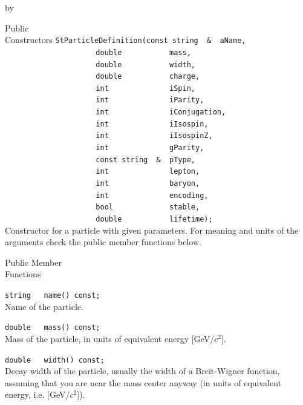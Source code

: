 \documentclass[twoside]{article}
\newcommand{\entrylabel}[1]{\mbox{\textbf{{#1}}}\hfil}%
\newenvironment{entry}
{\begin{list}{}%
    {\renewcommand{\makelabel}{\entrylabel}%
     \setlength{\labelwidth}{90pt}%
     \setlength{\leftmargin}{\labelwidth}
     \advance\leftmargin by \labelsep%
      }%
    }%
  {\end{list}}
\newcommand{\Entrylabel}[1]%
{\raisebox{0pt}[1ex][0pt]{\makebox[\labelwidth][l]%
    {\parbox[t]{\labelwidth}{\hspace{0pt}\textbf{{#1}}}}}}
\newenvironment{Entry}%
{\renewcommand{\entrylabel}{\Entrylabel}\begin{entry}}%
  {\end{entry}}
\begin{document}
\begin{description}
\begin{Entry}
\item[Public\\ Constructors]
    \verb+StParticleDefinition(const string  &  aName,+\\  
    \verb+                     double           mass,+\\      
    \verb+                     double           width,+\\ 
    \verb+                     double           charge,+\\    
    \verb+                     int              iSpin,+\\ 
    \verb+                     int              iParity,+\\ 
    \verb+                     int              iConjugation,+\\ 
    \verb+                     int              iIsospin,+\\    
    \verb+                     int              iIsospinZ,+\\  
    \verb+                     int              gParity,+\\ 
    \verb+                     const string  &  pType,+\\ 
    \verb+                     int              lepton,+\\ 
    \verb+                     int              baryon,+\\ 
    \verb+                     int              encoding,+\\ 
    \verb+                     bool             stable,+\\ 
    \verb+                     double           lifetime);+\\ 
    Constructor for a particle with given parameters. For meaning and units
    of the arguments check the public member functions below.
    
\item[Public Member\\ Functions]
   
    \verb+string   name() const;+\\
    Name of the particle.
    
    \verb+double   mass() const;+\\
    Mass of the particle, in units of equivalent energy [GeV/$c^2$].
    
    \verb+double   width() const;+\\
    Decay width of the particle, usually the width of a
    Breit-Wigner function, assuming that you are near the
    mass center anyway (in units of equivalent energy, i.e. [GeV/$c^2$]).
    

\end{Entry}
\end{description}
\end{document}
